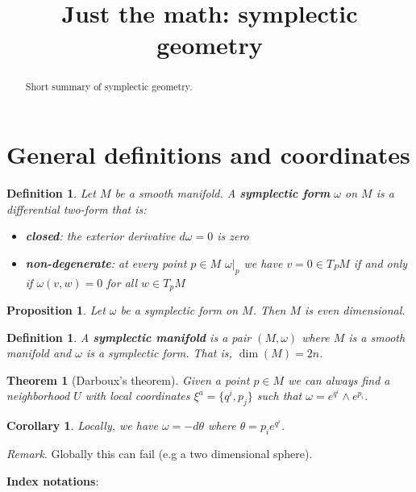 \documentclass{article}
\title{Just the math: symplectic geometry}
\date{\vspace{-5ex}}
\newtheorem{defn}[equation]{Definition}
\newtheorem{prop}[equation]{Proposition}
\newtheorem{coro}[equation]{Corollary}
\newtheorem{thrm}[equation]{Theorem}
\newenvironment{remark}{\noindent \emph{Remark}.}{\medskip}
\begin{document}
\maketitle


\begin{abstract}
Short summary of symplectic geometry.
\end{abstract}

\section{General definitions and coordinates}

\begin{defn}
	Let $M$ be a smooth manifold. A \textbf{symplectic form} $\omega$ on $M$ is a differential two-form that is:
	\begin{itemize}
		\item \textbf{closed}: the exterior derivative $d \omega = 0$ is zero
		\item \textbf{non-degenerate}: at every point $p \in M$ $\omega|_p$ we have $v=0 \in T_PM$ if and only if $\omega(v, w)=0$ for all $w \in T_pM$
	\end{itemize}
\end{defn}

\begin{prop}
	Let $\omega$ be a symplectic form on $M$. Then $M$ is even dimensional.
\end{prop}

\begin{defn}
	A \textbf{symplectic manifold} is a pair $(M, \omega)$ where $M$ is a smooth manifold and $\omega$ is a symplectic form. That is, $\dim(M)=2n$.
\end{defn}

\begin{thrm}[Darboux's theorem]
	Given a point $p \in M$ we can always find a neighborhood $U$ with local coordinates $\xi^a = \{q^i, p_j\}$ such that $\omega = e^{q^i} \wedge e^{p_i}$.
\end{thrm}

\begin{coro}
	Locally, we have $\omega = - d\theta$ where $\theta = p_i e^{q^i}$.
\end{coro}

\begin{remark}
	Globally this can fail (e.g a two dimensional sphere).
\end{remark}

\textbf{Index notations}:
\end{document}

